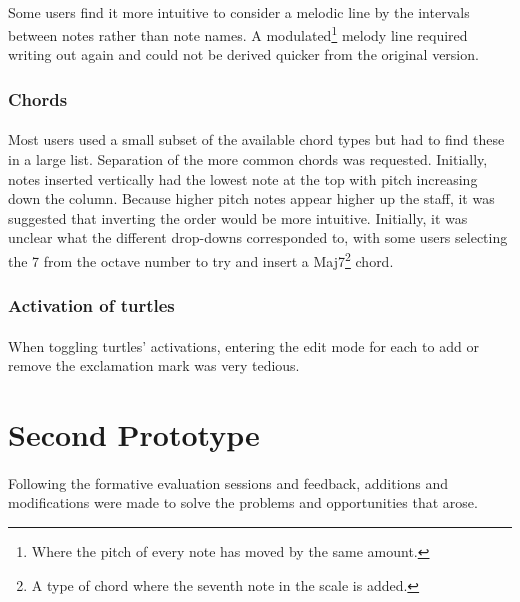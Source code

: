 \paragraph{} Some users find it more intuitive to consider a melodic line by the intervals between notes rather than note names. A modulated\footnote{Where the pitch of every note has moved by the same amount.} melody line required writing out again and could not be derived quicker from the original version.

\subsubsection{Chords}

\paragraph{} Most users used a small subset of the available chord types but had to find these in a large list. Separation of the more common chords was requested. Initially, notes inserted vertically  had the lowest note at the top with pitch increasing down the column. Because higher pitch notes appear higher up the staff, it was suggested that inverting the order would be more intuitive. Initially, it was unclear what the different drop-downs corresponded to, with some users selecting the 7 from the octave number to try and insert a Maj7\footnote{A type of chord where the seventh note in the scale is added.} chord.

\subsubsection{Activation of turtles}

\paragraph{} When toggling turtles' activations, entering the edit mode for each to add or remove the exclamation mark was very tedious.

\section{Second Prototype}

\paragraph{} Following the formative evaluation sessions and feedback, additions and modifications were made to solve the problems and opportunities that arose.

